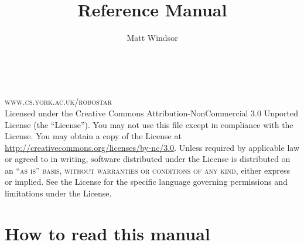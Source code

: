 \documentclass[11pt]{book}
\title{\langname{} Reference Manual}
\author{Matt Windsor}
\begin{document}
\frontmatter

%
%

\begingroup                                                                     
\makeatletter
\thispagestyle{empty} %
\makeatother
\vfill
\endgroup

%
%

\newpage
~\vfill
\thispagestyle{empty}

\noindent \textsc{www.cs.york.ac.uk/robostar}\\

\noindent Licensed under the Creative Commons
Attribution-NonCommercial 3.0 Unported License (the ``License''). You
may not use this file except in compliance with the License. You may
obtain a copy of the License at
\url{http://creativecommons.org/licenses/by-nc/3.0}. Unless required
by applicable law or agreed to in writing, software distributed under
the License is distributed on an \textsc{``as is'' basis, without
  warranties or conditions of any kind}, either express or
implied. See the License for the specific language governing
permissions and limitations under the License.\\


%
%

\usechapterimagefalse
\pagestyle{empty} %
\tableofcontents %
\cleardoublepage %
\pagestyle{fancy} %

%
%

\chapter*{How to read this manual}


\mainmatter
\end{document}
